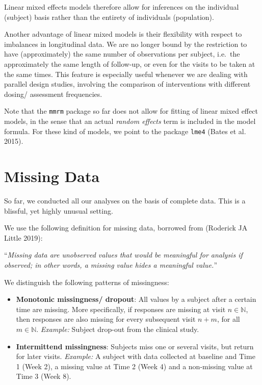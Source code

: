 \documentclass[
  letterpaper,
  DIV=11,
  numbers=noendperiod]{scrreprt}
\providecommand{\tightlist}{%
  \setlength{\itemsep}{0pt}\setlength{\parskip}{0pt}}\usepackage{longtable,booktabs,array}
\begin{document}
Linear mixed effects models therefore allow for inferences on the
individual (subject) basis rather than the entirety of individuals
(population).

Another advantage of linear mixed models is their flexibility with
respect to imbalances in longitudinal data. We are no longer bound by
the restriction to have (approximately) the same number of observations
per subject, i.e.~the approximately the same length of follow-up, or
even for the visits to be taken at the same times. This feature is
especially useful whenever we are dealing with parallel design studies,
involving the comparison of interventions with different dosing/
assessment frequencies.

Note that the \texttt{mmrm} package so far does not allow for fitting of
linear mixed effect models, in the sense that an actual \emph{random
effects} term is included in the model formula. For these kind of
models, we point to the package \texttt{lme4} (Bates et al. 2015).


\hypertarget{missing-data}{%
\chapter{Missing Data}\label{missing-data}}

So far, we conducted all our analyses on the basis of complete data.
This is a blissful, yet highly unusual setting.

We use the following definition for missing data, borrowed from
(Roderick JA Little 2019):

``\emph{Missing data are unobserved values that would be meaningful for
analysis if observed; in other words, a missing value hides a meaningful
value.}''

We distinguish the following patterns of missingness:

\begin{itemize}
\tightlist
\item
  \textbf{Monotonic missingness/ dropout}: All values by a subject after
  a certain time are missing. More specifically, if responses are
  missing at visit \(n \in \mathbb{N}\), then responses are also missing
  for every subsequent visit \(n + m\), for all \(m \in \mathbb{N}\).
  \emph{Example:} Subject drop-out from the clinical study.
\item
  \textbf{Intermittend missingness}: Subjects miss one or several
  visits, but return for later visits. \emph{Example:} A subject with
  data collected at baseline and Time 1 (Week 2), a missing value at
  Time 2 (Week 4) and a non-missing value at Time 3 (Week 8).
\end{itemize}
\end{document}
